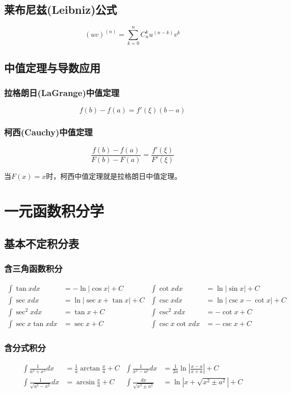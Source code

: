\subsection{莱布尼兹(Leibniz)公式}
\[(uv)^{(n)}=\sum_{k=0}^n C_n^k u^{(n-k)}v^{k}\]
\subsection{中值定理与导数应用}
\subsubsection{拉格朗日(LaGrange)中值定理}
\[f(b)-f(a)=f'(\xi)(b-a)\]
\subsubsection{柯西(Cauchy)中值定理}
\[\frac{f(b)-f(a)}{F(b)-F(a)}=\frac{f'(\xi)}{F'(\xi)}\]

当$F(x)=x$时，柯西中值定理就是拉格朗日中值定理。
\section{一元函数积分学}

\subsection{基本不定积分表}
\subsubsection{含三角函数积分}
\begin{align*}
 \int\tan xdx&=-\ln|\cos x|+C & \int\cot xdx&=\ln|\sin x|+C\\
 \int\sec xdx&=\ln|\sec x+\tan x|+C & \int\csc xdx&=\ln|\csc x-\cot x|+C\\
\int\sec^2 xdx&=\tan x+C&\int\csc^2 xdx &=-\cot x+C\\
\int\sec x\tan xdx&=\sec x+C&\int\csc x\cot xdx&=-\csc x+C
\end{align*}
\subsubsection{含分式积分}
\begin{align*}
\int \frac{1}{a^{2}+x^{2}}dx&=\frac{1}{a} \arctan \frac{x}{a}+C &
\int \frac{1}{x^{2}-a^{2}}dx&=\frac{1}{2 a} \ln \left|\frac{x-a}{x+a}\right|+C\\
    \int \frac{1}{\sqrt{a^{2}-x^{2}}}dx&=\arcsin \frac{x}{a}+C&
    \int \frac{d x}{\sqrt{x^{2} \pm a^{2}}}&=\ln \left|x+\sqrt{x^{2} \pm a^{2}}\right|+C
\end{align*}
